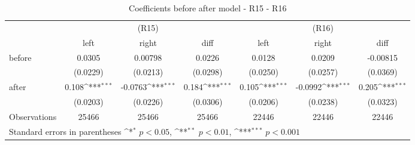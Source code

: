 \begin{table}[!ht]\centering \footnotesize
\def\sym#1{\ifmmode^{#1}\else\(^{#1}\)\fi}
\caption{Coefficients before after model - R15 - R16}
\begin{tabular}{l*{6}{c}}
\hline\hline
                    &\multicolumn{3}{c}{(R15)}&\multicolumn{3}{c}{(R16)}\\
&\multicolumn{1}{c}{left}&\multicolumn{1}{c}{right}&\multicolumn{1}{c}{diff}&\multicolumn{1}{c}{left}&\multicolumn{1}{c}{right}&\multicolumn{1}{c}{diff}\\
\hline
before              &      0.0305         &     0.00798         &      0.0226         &      0.0128         &      0.0209         &    -0.00815         \\
                    &    (0.0229)         &    (0.0213)         &    (0.0298)         &    (0.0250)         &    (0.0257)         &    (0.0369)         \\
[0.5em]
after               &       0.108\sym{***}&     -0.0763\sym{***}&       0.184\sym{***}&       0.105\sym{***}&     -0.0992\sym{***}&       0.205\sym{***}\\
                    &    (0.0203)         &    (0.0226)         &    (0.0306)         &    (0.0206)         &    (0.0238)         &    (0.0323)         \\
\hline
Observations        &       25466         &       25466         &       25466         &       22446         &       22446         &       22446         \\
\hline\hline
\multicolumn{7}{l}{ Standard errors in parentheses \sym{*} \(p<0.05\), \sym{**} \(p<0.01\), \sym{***} \(p<0.001\)}\\
\end{tabular}
\end{table}
